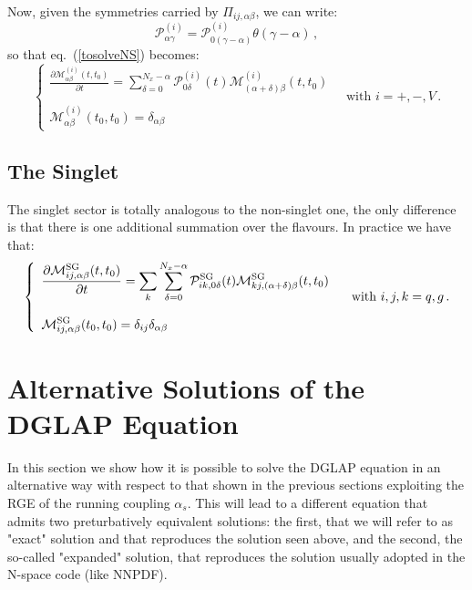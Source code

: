 \documentclass[10pt,a4paper]{article}
\begin{document}
Now, given the symmetries carried by $\Pi_{ij,\alpha\beta}$, we can write:
\begin{equation}
\mathcal{P}_{\alpha\gamma}^{(i)} = \mathcal{P}_{0(\gamma-\alpha)}^{(i)}\theta(\gamma-\alpha)\,,
\end{equation}
so that eq.~(\ref{tosolveNS}) becomes:
\begin{equation}\label{tosolveNS1}
\left\{\begin{array}{l}
\displaystyle \frac{\partial  \mathcal{M}_{\alpha\beta}^{(i)}(t,t_0)}{\partial t}= \sum_{\delta=0}^{N_x-\alpha} \mathcal{P}_{0\delta}^{(i)}(t)\mathcal{M}_{(\alpha+\delta)\beta}^{(i)}(t,t_0)\\
\\
\displaystyle \mathcal{M}_{\alpha\beta}^{(i)}(t_0,t_0)=\delta_{\alpha\beta}
\end{array}\right.\quad\mbox{with } i=+,-,V\,.
\end{equation}

\subsection{The Singlet}

The singlet sector is totally analogous to the non-singlet one, the only difference is that there is one additional summation over the flavours. In practice we have that:
\begin{equation}\label{tosolveSG}
\left\{\begin{array}{l}
\displaystyle \frac{\partial  \mathcal{M}_{ij,\alpha\beta}^{\rm SG}(t,t_0)}{\partial t}= \sum_k \sum_{\delta=0}^{N_x-\alpha} \mathcal{P}_{ik,0\delta}^{\rm SG}(t)\mathcal{M}_{kj,(\alpha+\delta)\beta}^{\rm SG}(t,t_0)\\
\\
\displaystyle \mathcal{M}_{ij,\alpha\beta}^{\rm SG}(t_0,t_0)=\delta_{ij}\delta_{\alpha\beta}
\end{array}\right.\quad\mbox{with }i,j,k=q,g\,.
\end{equation}

\section{Alternative Solutions of the DGLAP Equation}

In this section we show how it is possible to solve the DGLAP equation
in an alternative way with respect to that shown in the previous
sections exploiting the RGE of the running coupling $\alpha_s$. This
will lead to a different equation that admits two preturbatively
equivalent solutions: the first, that we will refer to as "exact"
solution and that reproduces the solution seen above, and the second, the
so-called "expanded" solution, that reproduces the solution usually
adopted in the N-space code (like NNPDF). 
\end{document}
